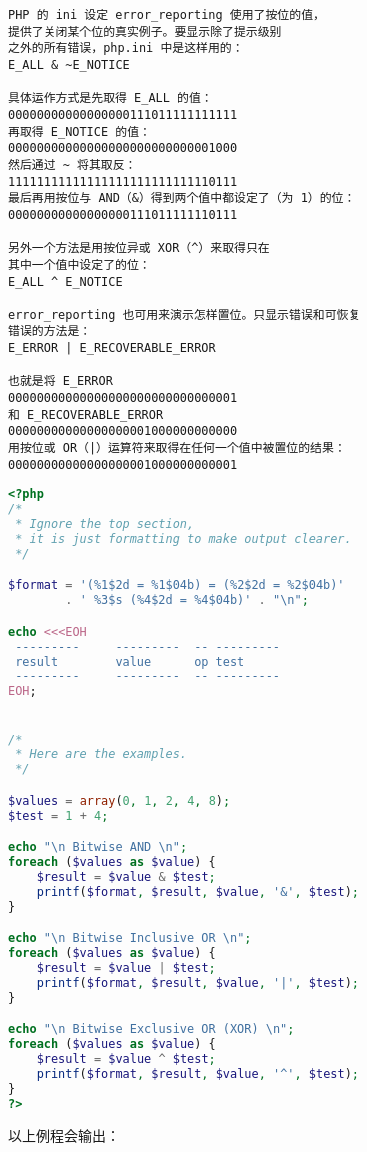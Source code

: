 \begin{verbatim}
PHP 的 ini 设定 error_reporting 使用了按位的值，
提供了关闭某个位的真实例子。要显示除了提示级别
之外的所有错误，php.ini 中是这样用的：
E_ALL & ~E_NOTICE
      
具体运作方式是先取得 E_ALL 的值：
00000000000000000111011111111111
再取得 E_NOTICE 的值：
00000000000000000000000000001000
然后通过 ~ 将其取反：
11111111111111111111111111110111
最后再用按位与 AND（&）得到两个值中都设定了（为 1）的位：
00000000000000000111011111110111
      
另外一个方法是用按位异或 XOR（^）来取得只在
其中一个值中设定了的位：
E_ALL ^ E_NOTICE
      
error_reporting 也可用来演示怎样置位。只显示错误和可恢复
错误的方法是：
E_ERROR | E_RECOVERABLE_ERROR
      
也就是将 E_ERROR
00000000000000000000000000000001
和 E_RECOVERABLE_ERROR
00000000000000000001000000000000
用按位或 OR（|）运算符来取得在任何一个值中被置位的结果：
00000000000000000001000000000001
\end{verbatim}

\begin{lstlisting}[language=PHP]
<?php
/*
 * Ignore the top section,
 * it is just formatting to make output clearer.
 */

$format = '(%1$2d = %1$04b) = (%2$2d = %2$04b)'
        . ' %3$s (%4$2d = %4$04b)' . "\n";

echo <<<EOH
 ---------     ---------  -- ---------
 result        value      op test
 ---------     ---------  -- ---------
EOH;


/*
 * Here are the examples.
 */

$values = array(0, 1, 2, 4, 8);
$test = 1 + 4;

echo "\n Bitwise AND \n";
foreach ($values as $value) {
    $result = $value & $test;
    printf($format, $result, $value, '&', $test);
}

echo "\n Bitwise Inclusive OR \n";
foreach ($values as $value) {
    $result = $value | $test;
    printf($format, $result, $value, '|', $test);
}

echo "\n Bitwise Exclusive OR (XOR) \n";
foreach ($values as $value) {
    $result = $value ^ $test;
    printf($format, $result, $value, '^', $test);
}
?>
\end{lstlisting}


以上例程会输出：

